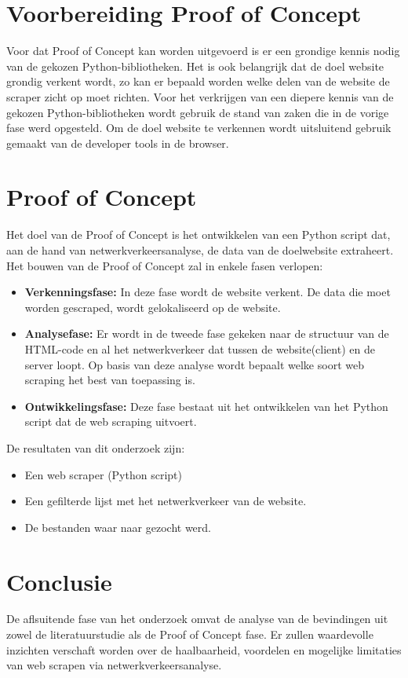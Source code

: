 \section{Voorbereiding Proof of Concept}
Voor dat Proof of Concept kan worden uitgevoerd is er een grondige kennis nodig van de gekozen Python-bibliotheken. Het is ook belangrijk dat de doel website grondig verkent wordt, zo kan er bepaald worden welke delen van de website de scraper zicht op moet richten. Voor het verkrijgen van een diepere kennis van de gekozen Python-bibliotheken wordt gebruik de stand van zaken die in de vorige fase werd opgesteld. Om de doel website te verkennen wordt uitsluitend gebruik gemaakt van de developer tools in de browser.

\section{Proof of Concept}
Het doel van de Proof of Concept is het ontwikkelen van een Python script dat, aan de hand van netwerkverkeersanalyse, de data van de doelwebsite extraheert.
Het bouwen van de Proof of Concept zal in enkele fasen verlopen:
\begin{itemize}
    \item \textbf{Verkenningsfase:} In deze fase wordt de website verkent. De data die moet worden gescraped, wordt gelokaliseerd op de website. 
    
    \item \textbf{Analysefase:} Er wordt in de tweede fase gekeken naar de structuur van de HTML-code en al het netwerkverkeer dat tussen de website(client) en de server loopt. Op basis van deze analyse wordt bepaalt welke soort web scraping het best van toepassing is.
    
    \item \textbf{Ontwikkelingsfase:} Deze fase bestaat uit het ontwikkelen van het Python script dat de web scraping uitvoert.
    
\end{itemize}
 De resultaten van dit onderzoek zijn: 
\begin{itemize}
    \item Een web scraper (Python script)
    \item Een gefilterde lijst met het netwerkverkeer van de website.
    \item De bestanden waar naar gezocht werd.
\end{itemize}

\section{Conclusie}
De aflsuitende fase van het onderzoek omvat de analyse van de bevindingen uit zowel de literatuurstudie als de Proof of Concept fase. Er zullen waardevolle inzichten verschaft worden over de haalbaarheid, voordelen en mogelijke limitaties van web scrapen via netwerkverkeersanalyse. 
